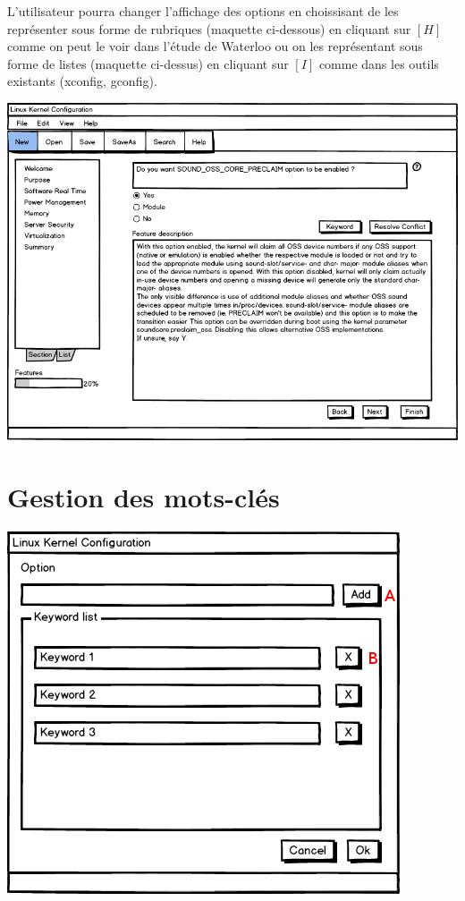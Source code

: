 \documentclass[16pts]{report}
\begin{document}
L'utilisateur pourra changer l'affichage des options en choissisant de les
représenter sous forme de rubriques (maquette ci-dessous) en cliquant sur $[H]$
comme on peut le voir dans l'étude de Waterloo ou on les représentant sous
forme de listes (maquette ci-dessus) en cliquant sur $[I]$ comme dans les
outils existants (xconfig, gconfig).

\includegraphics[scale=0.7]{illustrations/MainWindowSection_an.png} \\


\section{Gestion des mots-clés}
\label{sec:Gestion des mots-clés}
\includegraphics[scale=0.7]{illustrations/keyword_dialog_an.png}
\end{document}
